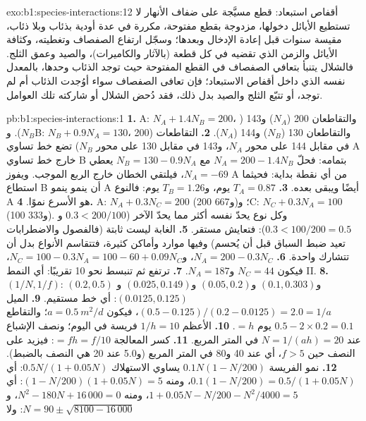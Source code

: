 \begin{solution}{exo:b1:species-interactions:12}
أقفاص استبعاد: قطع مسيَّجة على ضفاف الأنهار لا تستطيع الأيائل
دخولها، مزدوجة بقطع مفتوحة، مكررة في عدة أودية بذئاب
وبلا ذئاب، مقيسة سنوات قبل إعادة الإدخال
وبعدها؛ وسجّل ارتفاع الصفصاف وتغطيته، وكثافة الأيائل والزمن
الذي تقضيه في كل قطعة (بالآثار والكاميرات)، والصيد وعمق الثلج.
فالشلال يتنبأ بتعافي الصفصاف في القطع المفتوحة حيث توجد الذئاب
وحدها، بالمعدل نفسه الذي داخل أقفاص الاستبعاد؛ فإن تعافى الصفصاف
سواء أوُجدت الذئاب أم لم توجد، أو تتبّع الثلج والصيد بدل ذلك،
فقد دُحض الشلال أو شاركته تلك العوامل.
\end{solution}

\begin{solution}{pb:b1:species-interactions:1}
\textbf{1.} A: $N_A + 1.4 N_B = 200$، والتقاطعان 200 ($N_A$) و143
($N_B$). وB: $N_B + 0.9 N_A = 130$، والتقاطعان 130 ($N_B$) و144
($N_A$).
\textbf{2.} التقاطعات (200 في مقابل 144 على محور $N_A$، و143
في مقابل 130 على محور $N_B$) تضع خط تساوي A خارج خط تساوي B
بتمامه: فحلّ $N_A = 200 - 1.4 N_B$ مع $N_B = 130 - 0.9 N_A$ يعطي
$N_A = -69$، فيلتقي الخطان خارج الربع الموجب. ويفوز A من أي نقطة
بداية: فحيثما استطاع B أن ينمو ينمو A أيضًا ويبقى بعده.
\textbf{3.} $T_A = 0.87$ يوم، و$T_B = 1.26$ يوم: فالنوع A هو الأسرع
نموًا.
\textbf{4.} A: $N_A + 0.3 N_C = 200$ (200 و667)؛ وC: $N_C + 0.3 N_A =
100$ (100 و333). وكل نوع يحدّ نفسه أكثر مما يحدّ الآخر
($0.3 < 200/100$ و$0.3 < 100/200 = 0.5$): فتعايش مستقر.
\textbf{5.} الغابة ليست ثابتة (فالفصول والاضطرابات تعيد ضبط
السباق قبل أن يُحسم) وفيها موارد وأماكن كثيرة، فتتقاسم
الأنواع  بدل أن تتشارك واحدة.
\textbf{6.} $N_A = 200 - 0.3 N_C$، و$N_C = 100 - 0.3 N_A = 100 - 60 +
0.09 N_C$، فيكون $N_C = 44$ و$N_A = 187$.
\textbf{7.} ترتفع ثم تنبسط نحو 10 تقريبًا: أي النمط II.
\textbf{8.} $(1/N, 1/f)$: $(0.2, 0.5)$ و$(0.1, 0.303)$ و$(0.05, 0.2)$
و$(0.025, 0.149)$ و$(0.0125, 0.125)$: أي خط مستقيم.
\textbf{9.} الميل $(0.5 - 0.125)/(0.2 - 0.0125) = 2.0 = 1/a$، فيكون $a =
\qty{0.5}{m^2/d}$؛ والتقاطع $0.5 - 2\times 0.2 = 0.1$ يوم $= h$.
\textbf{10.} الأعظم $1/h = 10$ فريسة في اليوم؛ ونصف الإشباع عند $N =
1/(ah) = 20$ في المتر المربع.
\textbf{11.} كسر المعالجة $= f h = f/10$: فيزيد على النصف حين $f
> 5$، أي عند 40 و80 في المتر المربع (و5.0 عند 20 هي النصف بالضبط).
\textbf{12.} نمو الفريسة $0.1 N (1 - N/200)$ يساوي الاستهلاك
$0.5N/(1 + 0.05N)$: أي $0.1(1 - N/200) = 0.5/(1 + 0.05 N)$، ومنه
$(1 - N/200)(1 + 0.05N) = 5$: أي $1 + 0.05N - N/200 - N^2/4000 = 5$، ومنه
$N^2 - 180 N + 16\,000 = 0$، و$N = 90 \pm \sqrt{8100 - 16\,000}$: ولا

\end{solution}
